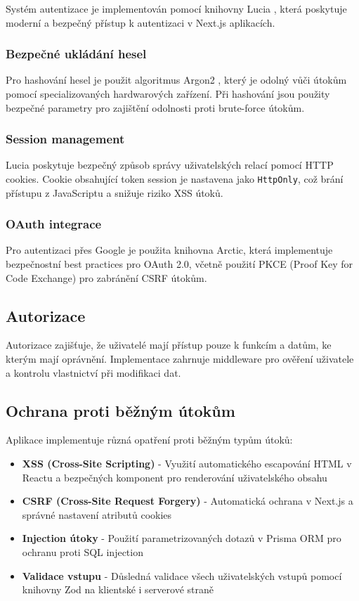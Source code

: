 \documentclass[12pt]{article}
\begin{document}
Systém autentizace je implementován pomocí knihovny Lucia \citep{Lucia2023}, která poskytuje moderní a bezpečný přístup k autentizaci v Next.js aplikacích.

\subsubsection{Bezpečné ukládání hesel}

Pro hashování hesel je použit algoritmus Argon2 \citep{Argon2GitHub}, který je odolný vůči útokům pomocí specializovaných hardwarových zařízení. Při hashování jsou použity bezpečné parametry pro zajištění odolnosti proti brute-force útokům.

\subsubsection{Session management}

Lucia poskytuje bezpečný způsob správy uživatelských relací pomocí HTTP cookies. Cookie obsahující token session je nastavena jako \texttt{HttpOnly}, což brání přístupu z JavaScriptu a snižuje riziko XSS útoků.

\subsubsection{OAuth integrace}

Pro autentizaci přes Google je použita knihovna Arctic, která implementuje bezpečnostní best practices pro OAuth 2.0, včetně použití PKCE (Proof Key for Code Exchange) pro zabránění CSRF útokům.

\subsection{Autorizace}

Autorizace zajišťuje, že uživatelé mají přístup pouze k funkcím a datům, ke kterým mají oprávnění. Implementace zahrnuje middleware pro ověření uživatele a kontrolu vlastnictví při modifikaci dat.

\subsection{Ochrana proti běžným útokům}

Aplikace implementuje různá opatření proti běžným typům útoků:

\begin{itemize}
    \item \textbf{XSS (Cross-Site Scripting)} - Využití automatického escapování HTML v Reactu a bezpečných komponent pro renderování uživatelského obsahu
    \item \textbf{CSRF (Cross-Site Request Forgery)} - Automatická ochrana v Next.js a správné nastavení atributů cookies
    \item \textbf{Injection útoky} - Použití parametrizovaných dotazů v Prisma ORM pro ochranu proti SQL injection
    \item \textbf{Validace vstupu} - Důsledná validace všech uživatelských vstupů pomocí knihovny Zod na klientské i serverové straně
\end{itemize}
\end{document}
